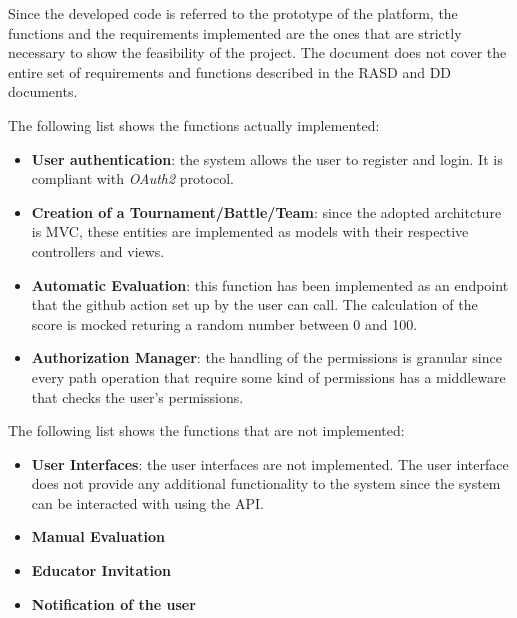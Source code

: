 Since the developed code is referred to the prototype of the platform, the functions and the requirements implemented are the ones that are strictly necessary to show the feasibility of the project. The document does not cover the entire set of requirements and functions described in the RASD and DD documents.

The following list shows the functions actually implemented:

\begin{itemize}
    \item \textbf{User authentication}: the system allows the user to register and login. It is compliant with \textit{OAuth2} protocol.
    \item \textbf{Creation of a Tournament/Battle/Team}: since the adopted architcture is MVC, these entities are implemented as models with their respective controllers and views.
    \item \textbf{Automatic Evaluation}: this function has been implemented as an endpoint that the github action set up by the user can call. The calculation of the score is mocked returing a random number between 0 and 100.
    \item \textbf{Authorization Manager}: the handling of the permissions is granular since every path operation that require some kind of permissions has a middleware that checks the user's permissions.
\end{itemize}

The following list shows the functions that are not implemented:

\begin{itemize}
    \item \textbf{User Interfaces}: the user interfaces are not implemented. The user interface does not provide any additional functionality to the system since the system can be interacted with using the API.
    \item \textbf{Manual Evaluation}
    \item \textbf{Educator Invitation}
    \item \textbf{Notification of the user}
\end{itemize}